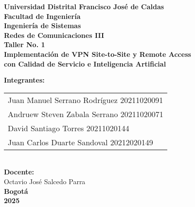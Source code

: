 \begin{titlepage}
    \centering
    \vspace*{2cm}
    
    {\huge\bfseries Universidad Distrital Francisco José de Caldas}\\[0.5cm]
    {\large\bfseries Facultad de Ingeniería}\\[0.3cm]
    {\large\bfseries Ingeniería de Sistemas}\\[2cm]
    
    {\Huge\bfseries Redes de Comunicaciones III}\\[0.5cm]
    {\huge\bfseries Taller No. 1}\\[1cm]
    
    {\Large\bfseries Implementación de VPN Site-to-Site y Remote Access}\\
    {\Large\bfseries con Calidad de Servicio e Inteligencia Artificial}\\[2cm]
    
    \begin{minipage}{0.8\textwidth}
        \centering
        {\large\bfseries Integrantes:}\\[0.5cm]
        \begin{tabular}{l}
            Juan Manuel Serrano Rodríguez \textendash{} 20211020091 \\[0.2cm]
            Andruew Steven Zabala Serrano \textendash{} 20211020071 \\[0.2cm]
            David Santiago Torres \textendash{} 20211020144 \\[0.2cm]
            Juan Carlos Duarte Sandoval \textendash{} 20212020149
        \end{tabular}
    \end{minipage}\\[1.5cm]
    
    {\large \bfseries Docente:}\\
    {\large Octavio José Salcedo Parra}\\[2cm]
    
    {\large\bfseries Bogotá}\\
    {\large\bfseries 2025}
    
\end{titlepage}
